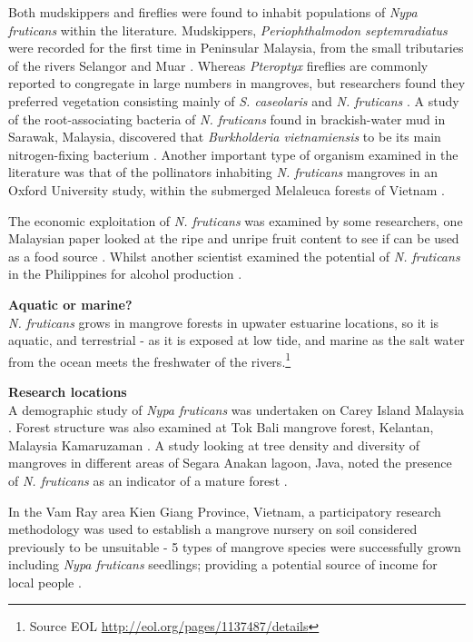 \documentclass[openany]{book}
\let\rmarkdownfootnote\footnote%
\def\footnote{\protect\rmarkdownfootnote}
\theoremstyle{definition}
\theoremstyle{definition}
\theoremstyle{definition}
\theoremstyle{remark}
\begin{document}
Both mudskippers and fireflies were found to inhabit populations of
\emph{Nypa fruticans} within the literature. Mudskippers,
\emph{Periophthalmodon septemradiatus} were recorded for the first time
in Peninsular Malaysia, from the small tributaries of the rivers
Selangor and Muar \citep{Khaironizam_2003}. Whereas \emph{Pteroptyx}
fireflies are commonly reported to congregate in large numbers in
mangroves, but researchers found they preferred vegetation consisting
mainly of \emph{S. caseolaris} and \emph{N. fruticans}
\citep{Jusoh_2010}. A study of the root-associating bacteria of \emph{N.
fruticans} found in brackish-water mud in Sarawak, Malaysia, discovered
that \emph{Burkholderia vietnamiensis} to be its main nitrogen-fixing
bacterium \citep{Tang_2010}. Another important type of organism examined
in the literature was that of the pollinators inhabiting \emph{N.
fruticans} mangroves in an Oxford University study, within the submerged
Melaleuca forests of Vietnam \citep{Quang_Tan_2008}.

The economic exploitation of \emph{N. fruticans} was examined by some
researchers, one Malaysian paper looked at the ripe and unripe fruit
content to see if can be used as a food source \citep{Chau_Sum_2013}.
Whilst another scientist examined the potential of \emph{N. fruticans}
in the Philippines for alcohol production \citep{Rasco_2010}.

\textbf{Aquatic or marine?}\\
\emph{N. fruticans} grows in mangrove forests in upwater estuarine
locations, so it is aquatic, and terrestrial - as it is exposed at low
tide, and marine as the salt water from the ocean meets the freshwater
of the rivers.\footnote{Source EOL
  \url{http://eol.org/pages/1137487/details}}

\textbf{Research locations}\\
A demographic study of \emph{Nypa fruticans} was undertaken on Carey
Island Malaysia \citep{Aslezaeim_2010}. Forest structure was also
examined at Tok Bali mangrove forest, Kelantan, Malaysia Kamaruzaman
\citep{Kamaruzaman_2007}. A study looking at tree density and diversity
of mangroves in different areas of Segara Anakan lagoon, Java, noted the
presence of \emph{N. fruticans} as an indicator of a mature forest
\citep{Hinrichs_2008}.

In the Vam Ray area Kien Giang Province, Vietnam, a participatory
research methodology was used to establish a mangrove nursery on soil
considered previously to be unsuitable - 5 types of mangrove species
were successfully grown including \emph{Nypa fruticans} seedlings;
providing a potential source of income for local people
\citep{Nguyen_2016}.
\end{document}
